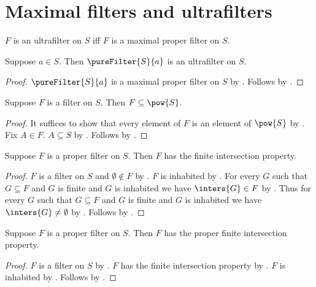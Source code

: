 \section{Maximal filters and ultrafilters}




\begin{definition}\label{ultrafilter}
    $F$ is an ultrafilter on $S$ iff
        $F$ is a maximal proper filter on $S$.
\end{definition}

\begin{corollary}\label{pure_filter_is_ultrafilter}
    Suppose $a\in S$.
    Then $\pureFilter{S}{a}$ is an ultrafilter on $S$.
\end{corollary}
\begin{proof}
    $\pureFilter{S}{a}$ is a maximal proper filter on $S$ by
        .
    Follows by .
\end{proof}

\begin{proposition}\label{filter_subseteq_powerset}
    Suppose $F$ is a filter on $S$.
    Then $F\subseteq\pow{S}$.
\end{proposition}
\begin{proof}
    It suffices to show that every element of $F$ is an element of $\pow{S}$
        by .
    Fix $A\in F$.
    $A\subseteq S$ by .
    Follows by .
\end{proof}

\begin{proposition}\label{filter_has_finite_intersection_property}
    Suppose $F$ is a proper filter on $S$.
    Then $F$ has the finite intersection property.
\end{proposition}
\begin{proof}
    $F$ is a filter on $S$ and $\emptyset\notin F$
        by .
    $F$ is inhabited by .
    For every $G$ such that $G\subseteq F$ and $G$ is finite and
        $G$ is inhabited we have $\inters{G}\in F$
        by .
    Thus for every $G$ such that $G\subseteq F$ and $G$ is finite and
        $G$ is inhabited we have $\inters{G}\neq\emptyset$
        by \auto.
    Follows by .
\end{proof}

\begin{proposition}\label{filter_has_proper_finite_intersection_property}
    Suppose $F$ is a proper filter on $S$.
    Then $F$ has the proper finite intersection property.
\end{proposition}
\begin{proof}
    $F$ is a filter on $S$ by .
    $F$ has the finite intersection property
        by .
    $F$ is inhabited by .
    Follows by .
\end{proof}

